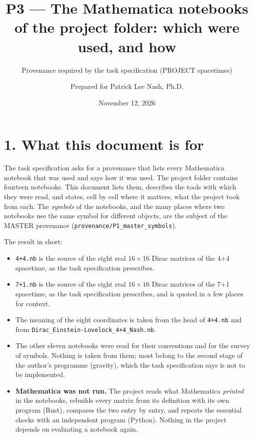 \documentclass[
  10pt,
]{article}
\title{P3 --- The Mathematica notebooks of the project folder: which
were used, and how}
\subtitle{Provenance required by the task specification (PROJECT
spacetimes)}
\author{Prepared for Patrick Lee Nash, Ph.D.}
\date{November 12, 2026}
\providecommand{\tightlist}{%
  \setlength{\itemsep}{0pt}\setlength{\parskip}{0pt}}
\begin{document}
\maketitle

\hypertarget{what-this-document-is-for}{%
\section{1. What this document is for}\label{what-this-document-is-for}}

The task specification asks for a provenance that lists every
Mathematica notebook that was used and says how it was used. The project
folder contains fourteen notebooks. This document lists them, describes
the tools with which they were read, and states, cell by cell where it
matters, what the project took from each. The \emph{symbols} of the
notebooks, and the many places where two notebooks use the same symbol
for different objects, are the subject of the MASTER provenance
(\texttt{provenance/P1\_master\_symbols}).

The result in short:

\begin{itemize}
\tightlist
\item
  \texttt{4+4.nb} is the source of the eight real \(16\times16\) Dirac
  matrices of the 4+4 spacetime, as the task specification prescribes.
\item
  \texttt{7+1.nb} is the source of the eight real \(16\times16\) Dirac
  matrices of the 7+1 spacetime, as the task specification prescribes,
  and is quoted in a few places for context.
\item
  The meaning of the eight coordinates is taken from the head of
  \texttt{4+4.nb} and from
  \texttt{Dirac\_Einstein-Lovelock\_4+4\_Nash.nb}.
\item
  The other eleven notebooks were read for their conventions and for the
  survey of symbols. Nothing is taken from them; most belong to the
  second stage of the author's programme (gravity), which the task
  specification says is not to be implemented.
\item
  \textbf{Mathematica was not run.} The project reads what Mathematica
  \emph{printed} in the notebooks, rebuilds every matrix from its
  definition with its own program (Rust), compares the two entry by
  entry, and repeats the essential checks with an independent program
  (Python). Nothing in the project depends on evaluating a notebook
  again.
\end{itemize}
\end{document}
